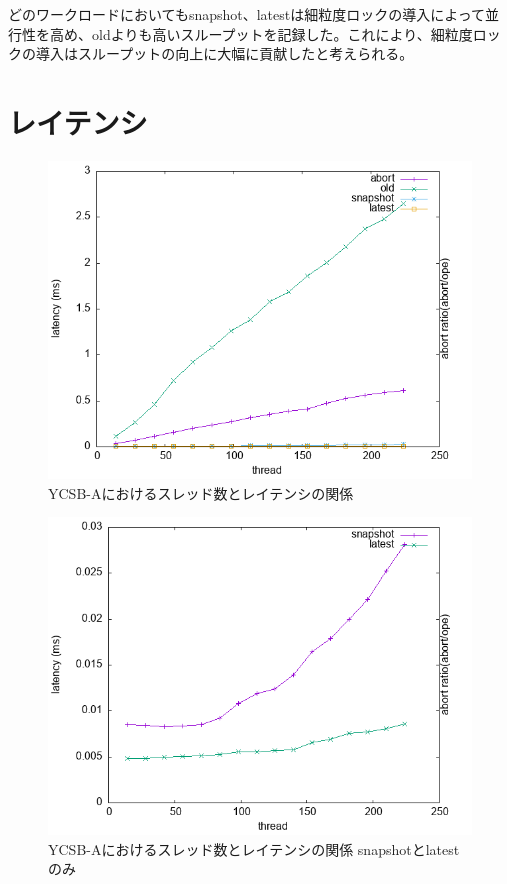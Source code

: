 \documentclass[a4paper]{jreport}	%
\begin{document}
どのワークロードにおいてもsnapshot、latestは細粒度ロックの導入によって並行性を高め、oldよりも高いスループットを記録した。これにより、細粒度ロックの導入はスループットの向上に大幅に貢献したと考えられる。

\section{レイテンシ}

\begin{figure}[h] 
\centering
\includegraphics[width=15cm]{data/stable/ycsb-a/latency}
\caption{YCSB-Aにおけるスレッド数とレイテンシの関係}
\label{fig:latency-a}
\end{figure}

\begin{figure}[h] 
\centering
\includegraphics[width=15cm]{data/stable/ycsb-a/latency2}
\caption{YCSB-Aにおけるスレッド数とレイテンシの関係 snapshotとlatestのみ}
\label{fig:latency-a2}
\end{figure}
\end{document}
